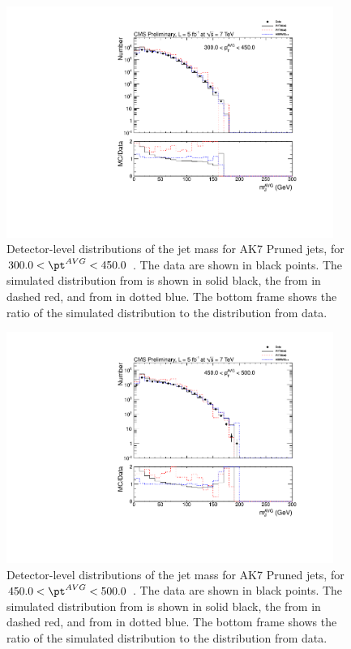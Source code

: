 \begin{figure}[htbp]
\centering
\includegraphics[width=0.95\textwidth]{figs/histAK7MjetVsPtAvg_rawDataMCComparisons_pt_5_Pruned}
\caption{Detector-level distributions of the jet mass for AK7 Pruned jets,
for $300.0 < \pt^{AVG} < 450.0$ \GeVc. The data are shown in black points.
The simulated distribution from \PYTHIA is shown in solid black, 
the from \PYTHIAEIGHT in dashed red, and from \HERWIG in dotted blue. 
The bottom frame shows the ratio of the simulated distribution
to the distribution from data. 
\label{figs:histAK7MjetVsPtAvg_rawDataMCComparisons_pt_5_Pruned}}
\end{figure}



\begin{figure}[htbp]
\centering
\includegraphics[width=0.95\textwidth]{figs/histAK7MjetVsPtAvg_rawDataMCComparisons_pt_6_Pruned}
\caption{Detector-level distributions of the jet mass for AK7 Pruned jets,
for $450.0 < \pt^{AVG} < 500.0$ \GeVc. The data are shown in black points.
The simulated distribution from \PYTHIA is shown in solid black, 
the from \PYTHIAEIGHT in dashed red, and from \HERWIG in dotted blue. 
The bottom frame shows the ratio of the simulated distribution
to the distribution from data. 
\label{figs:histAK7MjetVsPtAvg_rawDataMCComparisons_pt_6_Pruned}}
\end{figure}




